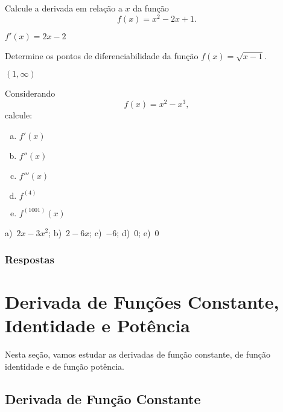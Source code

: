 \begin{exer}
  Calcule a derivada em relação a $x$ da função
  \begin{equation}
    f(x) = x^2 - 2x + 1.
  \end{equation}
\end{exer}
\begin{resp}
  $f'(x) = 2x - 2$
\end{resp}

\begin{exer}
  Determine os pontos de diferenciabilidade da função $f(x) = \sqrt{x-1}$.
\end{exer}
\begin{resp}
  $(1, \infty)$
\end{resp}

\begin{exer}
  Considerando
  \begin{equation}
    f(x) = x^2-x^3,
  \end{equation}
  calcule:
  \begin{enumerate}[a)]
  \item $f'(x)$
  \item $f''(x)$
  \item $f'''(x)$
  \item $f^{(4)}$
  \item $f^{(1001)}(x)$
  \end{enumerate}
\end{exer}
\begin{resp}
  a)~$2x-3x^2$; b)~$2-6x$; c)~$-6$; d)~$0$; e)~$0$
\end{resp}

\ifisbook
\subsubsection{Respostas}
\shipoutAnswer
\fi


\section{Derivada de Funções Constante, Identidade e Potência}\label{cap_deriv_sec_funcip}

Nesta seção, vamos estudar as derivadas de função constante, de função identidade e de função potência.

\subsection{Derivada de Função Constante}


